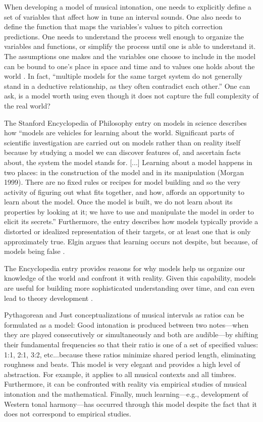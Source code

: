 When developing a model of musical intonation, one needs to explicitly define a set of variables that affect how in tune an interval sounds. One also needs to define the function that maps the variables's values to pitch correction predictions. One needs to understand the process well enough to organize the variables and functions, or simplify the process until one is able to understand it. The assumptions one makes and the variables one choose to include in the model can be bound to one's place in space and time and to values one holds about the world \cite{bacharach1989organizational}. In fact, ``multiple models for the same target system do not generally stand in a deductive relationship, as they often contradict each other.'' \cite{sep-models-science} One can ask, is a model worth using even though it does not capture the full complexity of the real world? 

The Stanford Encyclopedia of Philosophy entry on models in science describes how ``models are vehicles for learning about the world. Significant parts of scientific investigation are carried out on models rather than on reality itself because by studying a model we can discover features of, and ascertain facts about, the system the model stands for. [...] Learning about a model happens in two places: in the construction of the model and in its manipulation (Morgan 1999). There are no fixed rules or recipes for model building and so the very activity of figuring out what fits together, and how, affords an opportunity to learn about the model. Once the model is built, we do not learn about its properties by looking at it; we have to use and manipulate the model in order to elicit its secrets.'' \cite{sep-models-science} Furthermore, the entry describes how models typically provide a distorted or idealized representation of their targets, or at least one that is only approximately true. Elgin argues that learning occurs not despite, but because, of models being false \cite{elgin2017true}. 

The Encyclopedia entry provides reasons for why models help us organize our knowledge of the world and confront it with reality. Given this capability, models are useful for building more sophisticated understanding over time, and can even lead to theory development \cite{sep-models-science}.

Pythagorean and Just conceptualizations of musical intervals as ratios can be formulated as a model: Good intonation is produced between two notes---when they are played consecutively or simultaneously and both are audible---by shifting their fundamental frequencies so that their ratio is one of a set of specified values: 1:1, 2:1, 3:2, etc...because these ratios minimize shared period length, eliminating roughness and beats. This model is very elegant and provides a high level of abstraction. For example, it applies to all musical contexts and all timbres. Furthermore, it can be confronted with reality via  empirical studies of musical intonation and the mathematical. Finally, much learning---e.g., development of Western tonal harmony---has occurred through this model despite the fact that it does not correspond to empirical studies. 


